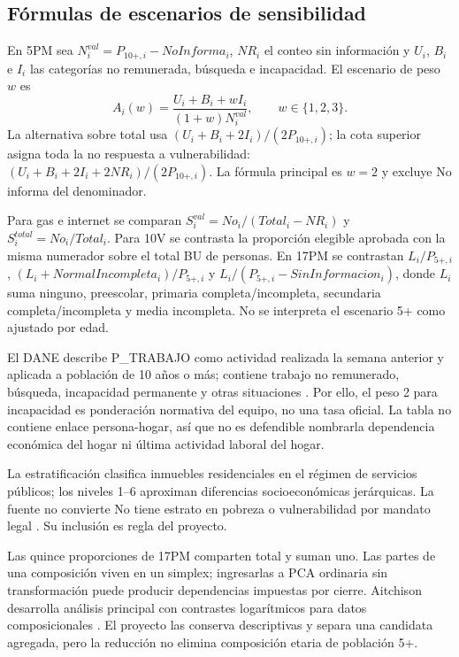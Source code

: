 \documentclass[11pt,a4paper]{article}
\begin{document}
\subsection{Fórmulas de escenarios de sensibilidad}

En 5PM sea $N_i^{val}=P_{10+,i}-NoInforma_i$, $NR_i$ el conteo sin información y $U_i$, $B_i$ e $I_i$ las categorías no remunerada, búsqueda e incapacidad. El escenario de peso $w$ es
\begin{equation}
A_i(w)=\frac{U_i+B_i+wI_i}{(1+w)N_i^{val}},\qquad w\in\{1,2,3\}.
\end{equation}
La alternativa sobre total usa $(U_i+B_i+2I_i)/(2P_{10+,i})$; la cota superior asigna toda la no respuesta a vulnerabilidad: $(U_i+B_i+2I_i+2NR_i)/(2P_{10+,i})$. La fórmula principal es $w=2$ y excluye No informa del denominador.

Para gas e internet se comparan $S_i^{val}=No_i/(Total_i-NR_i)$ y $S_i^{total}=No_i/Total_i$. Para 10V se contrasta la proporción elegible aprobada con la misma numerador sobre el total BU de personas. En 17PM se contrastan $L_i/P_{5+,i}$, $(L_i+NormalIncompleta_i)/P_{5+,i}$ y $L_i/(P_{5+,i}-SinInformacion_i)$, donde $L_i$ suma ninguno, preescolar, primaria completa/incompleta, secundaria completa/incompleta y media incompleta. No se interpreta el escenario 5+ como ajustado por edad.

El DANE describe P\_TRABAJO como actividad realizada la semana anterior y aplicada a población de 10 años o más; contiene trabajo no remunerado, búsqueda, incapacidad permanente y otras situaciones \citep{dane_ptrabajo_cnpv2018}. Por ello, el peso 2 para incapacidad es ponderación normativa del equipo, no una tasa oficial. La tabla no contiene enlace persona-hogar, así que no es defendible nombrarla dependencia económica del hogar ni última actividad laboral del hogar.

La estratificación clasifica inmuebles residenciales en el régimen de servicios públicos; los niveles 1--6 aproximan diferencias socioeconómicas jerárquicas. La fuente no convierte No tiene estrato en pobreza o vulnerabilidad por mandato legal \citep{dane_estratificacion}. Su inclusión es regla del proyecto.

Las quince proporciones de 17PM comparten total y suman uno. Las partes de una composición viven en un simplex; ingresarlas a PCA ordinaria sin transformación puede producir dependencias impuestas por cierre. Aitchison desarrolla análisis principal con contrastes logarítmicos para datos composicionales \citep{aitchison1983compositional}. El proyecto las conserva descriptivas y separa una candidata agregada, pero la reducción no elimina composición etaria de población 5+.
\end{document}
